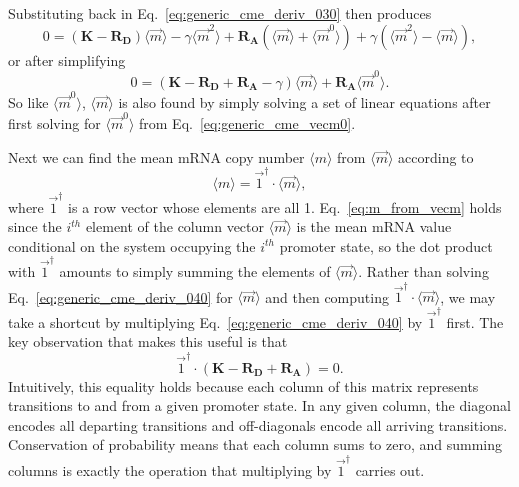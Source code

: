 Substituting back in Eq.~\ref{eq:generic_cme_deriv_030} then produces
\begin{equation}
0 = (\mathbf{K} - \mathbf{R_D}) \langle\vec{m}\rangle
- \gamma \langle\vec{m}^2\rangle
+ \mathbf{R_A} (\langle\vec{m}\rangle + \langle\vec{m}^0\rangle)
+ \gamma (\langle\vec{m}^2\rangle - \langle\vec{m}\rangle),
\end{equation}
or after simplifying
\begin{equation}
0 = (\mathbf{K} - \mathbf{R_D} + \mathbf{R_A} - \gamma) \langle\vec{m}\rangle
+ \mathbf{R_A} \langle\vec{m}^0\rangle.
\label{eq:generic_cme_deriv_040}
\end{equation}
So like $\langle\vec{m}^0\rangle$, $\langle\vec{m}\rangle$ is also found by
simply solving a set of linear equations after first solving for
$\langle\vec{m}^0\rangle$ from Eq.~\ref{eq:generic_cme_vecm0}.

Next we can find the mean mRNA copy number $\langle{m}\rangle$ from
$\langle\vec{m}\rangle$ according to
\begin{equation}
\langle{m}\rangle = \vec{1}^\dagger\cdot\langle\vec{m}\rangle,
\label{eq:m_from_vecm}
\end{equation}
where $\vec{1}^\dagger$ is a row vector whose elements are all 1.
Eq.~\ref{eq:m_from_vecm} holds since the $i^{th}$ element of the column vector
$\langle\vec{m}\rangle$ is the mean mRNA value conditional on the system
occupying the $i^{th}$ promoter state, so the dot product with $\vec{1}^\dagger$
amounts to simply summing the elements of $\langle\vec{m}\rangle$. Rather than
solving Eq.~\ref{eq:generic_cme_deriv_040} for $\langle\vec{m}\rangle$ and then
computing $\vec{1}^\dagger\cdot\langle\vec{m}\rangle$, we may take a shortcut by
multiplying Eq.~\ref{eq:generic_cme_deriv_040} by $\vec{1}^\dagger$ first. The
key observation that makes this useful is that
\begin{equation}
\vec{1}^\dagger \cdot (\mathbf{K} - \mathbf{R_D} + \mathbf{R_A}) = 0.
\end{equation}
Intuitively, this equality holds because each column of this matrix
represents transitions to and from a given promoter state. In any given column,
the diagonal encodes all departing transitions and off-diagonals encode all
arriving transitions. Conservation of probability means that each column
sums to zero, and summing columns is exactly the operation that multiplying by
$\vec{1}^\dagger$ carries out.

